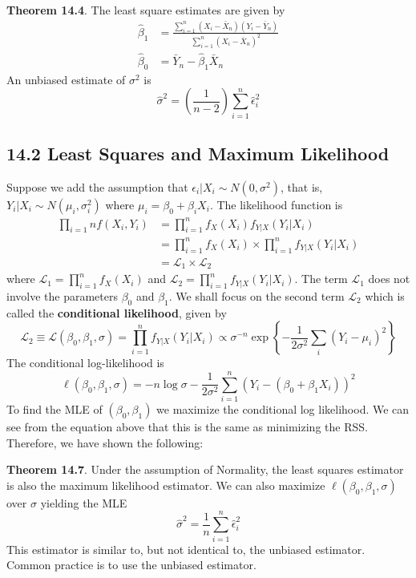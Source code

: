 \textbf{Theorem 14.4}. The least square estimates are given by
\begin{align*}
\hat{\beta}_{1} &= \frac{\sum_{i=1}^{n} (X_{i} - \bar{X}_{n}) (Y_{i} - \bar{Y}_{n})}{\sum_{i=1}^{n} (X_{i} - \bar{X}_{n})^{2}}\\
\hat{\beta}_{0} &= \bar{Y}_{n} - \hat{\beta}_{1} \bar{X}_{n}
\end{align*}
An unbiased estimate of \(\sigma^{2}\) is
\[
\hat{\sigma}^{2} = \left( \frac{1}{n - 2} \right) \sum_{i=1}^{n} \hat{\epsilon}_{i}^{2}
\]

\subsection*{14.2 Least Squares and Maximum
Likelihood}\label{least-squares-and-maximum-likelihood}
Suppose we add the assumption that
\(\epsilon_{i} | X_{i} \sim N(0, \sigma^{2})\), that is,
\(Y_{i} | X_{i} \sim N(\mu_{i}, \sigma_{i}^{2})\)
where \(\mu_{i} = \beta_{0} + \beta_{i} X_{i}\). The likelihood function is
\begin{align*}
\prod_{i=1}n f(X_{i}, Y_{i}) &= \prod_{i=1}^{n} f_X(X_{i}) f_{Y|X}(Y_{i} | X_{i})\\
&= \prod_{i=1}^{n} f_X(X_{i}) \times \prod_{i=1}^{n} f_{Y|X}(Y_{i} | X_{i}) \\
&= \mathcal{L}_{1} \times \mathcal{L}_{2}
\end{align*}
where \(\mathcal{L}_{1} = \prod_{i=1}^{n} f_X(X_{i})\) and
\(\mathcal{L}_{2} = \prod_{i=1}^{n} f_{Y|X}(Y_{i} | X_{i})\).
The term \(\mathcal{L}_{1}\) does not involve the parameters \(\beta_{0}\)
and \(\beta_{1}\). We shall focus on the second term \(\mathcal{L}_{2}\)
which is called the \textbf{conditional likelihood}, given by
\[
\mathcal{L}_{2} \equiv \mathcal{L}(\beta_{0}, \beta_{1}, \sigma)
= \prod_{i=1}^{n} f_{Y|X}(Y_{i} | X_{i})
\propto \sigma^{-n} \exp \left\{ - \frac{1}{2 \sigma^{2}} \sum_{i} (Y_{i} - \mu_{i})^{2} \right\}
\]
The conditional log-likelihood is
\[
\ell(\beta_{0}, \beta_{1}, \sigma) = -n \log \sigma - \frac{1}{2 \sigma^{2}} \sum_{i=1}^{n} \left(Y_{i} - (\beta_{0} + \beta_{1} X_{i}) \right)^{2}
\]
To find the MLE of \((\beta_{0}, \beta_{1})\) we maximize the conditional
log likelihood. We can see from the equation above that this is the same
as minimizing the RSS. Therefore, we have shown the following:

\textbf{Theorem 14.7}. Under the assumption of Normality, the least
squares estimator is also the maximum likelihood estimator.
We can also maximize \(\ell(\beta_{0}, \beta_{1}, \sigma)\) over \(\sigma\)
yielding the MLE
\[
\hat{\sigma}^{2} = \frac{1}{n} \sum_{i=1}^{n} \hat{\epsilon}_{i}^{2}
\]
This estimator is similar to, but not identical to, the unbiased
estimator. Common practice is to use the unbiased estimator.


